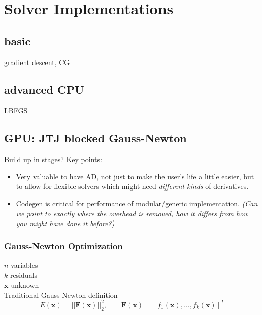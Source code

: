 \section{Solver Implementations}
\label{sub:solver_implementations}

\subsection{basic}
gradient descent, CG

\subsection{advanced CPU}
LBFGS

\subsection{GPU: JTJ blocked Gauss-Newton}
Build up in stages?
Key points:

\begin{itemize}
  \item Very valuable to have AD, not just to make the user's life a little easier, but to allow for flexible solvers which might need \emph{different kinds} of derivatives.
  \item Codegen is critical for performance of modular/generic implementation. \emph{(Can we point to exactly where the overhead is removed, how it differs from how you might have done it before?)}
\end{itemize}

\subsubsection{Gauss-Newton Optimization} %
\label{sec:jtj}
$n$ variables\\
$k$ residuals\\
$\mathbf{x}$ unknown\\
Traditional Gauss-Newton definition
$$E (\mathbf{x}) = || \mathbf{F}(\mathbf{x}) ||_2^2,\qquad \mathbf{F}(\mathbf{x})  =[f_1(\mathbf{x}), \hdots, f_k(\mathbf{x})]^T$$



